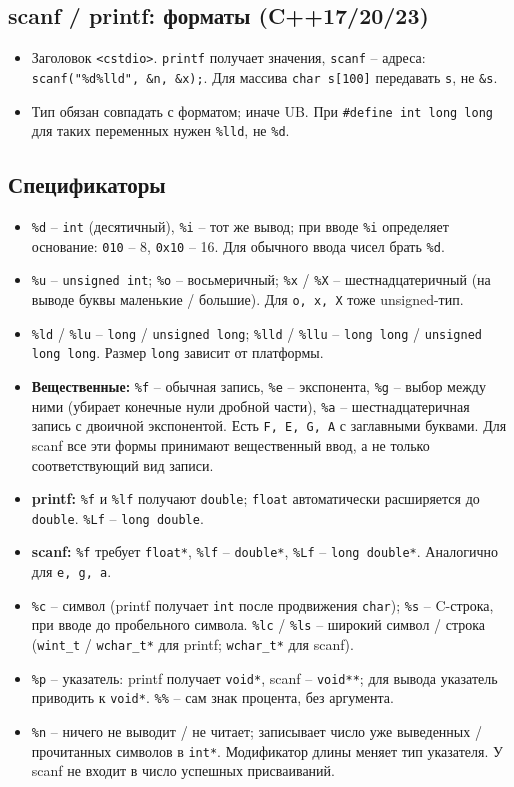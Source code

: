 \subsection{scanf / printf: форматы (C++17/20/23)}
\begin{itemize}[leftmargin=*, nosep]
\item Заголовок \verb|<cstdio>|. \verb|printf| получает значения, \verb|scanf| -- адреса: \verb|scanf("%d%lld", &n, &x);|. Для массива \verb|char s[100]| передавать \verb|s|, не \verb|&s|.
\item Тип обязан совпадать с форматом; иначе UB. При \verb|#define int long long| для таких переменных нужен \verb|%lld|, не \verb|%d|.
\end{itemize}

\subsection{Спецификаторы}
\begin{itemize}[leftmargin=*, nosep]
\item \verb|%d| -- \verb|int| (десятичный), \verb|%i| -- тот же вывод; при вводе \verb|%i| определяет основание: \verb|010| -- 8, \verb|0x10| -- 16. Для обычного ввода чисел брать \verb|%d|.
\item \verb|%u| -- \verb|unsigned int|; \verb|%o| -- восьмеричный; \verb|%x| / \verb|%X| -- шестнадцатеричный (на выводе буквы маленькие / большие). Для \verb|o, x, X| тоже unsigned-тип.
\item \verb|%ld| / \verb|%lu| -- \verb|long| / \verb|unsigned long|; \verb|%lld| / \verb|%llu| -- \verb|long long| / \verb|unsigned long long|. Размер \verb|long| зависит от платформы.
\item \textbf{Вещественные:} \verb|%f| -- обычная запись, \verb|%e| -- экспонента, \verb|%g| -- выбор между ними (убирает конечные нули дробной части), \verb|%a| -- шестнадцатеричная запись с двоичной экспонентой. Есть \verb|F, E, G, A| с заглавными буквами. Для scanf все эти формы принимают вещественный ввод, а не только соответствующий вид записи.
\item \textbf{printf:} \verb|%f| и \verb|%lf| получают \verb|double|; \verb|float| автоматически расширяется до \verb|double|. \verb|%Lf| -- \verb|long double|.
\item \textbf{scanf:} \verb|%f| требует \verb|float*|, \verb|%lf| -- \verb|double*|, \verb|%Lf| -- \verb|long double*|. Аналогично для \verb|e, g, a|.
\item \verb|%c| -- символ (printf получает \verb|int| после продвижения \verb|char|); \verb|%s| -- C-строка, при вводе до пробельного символа. \verb|%lc| / \verb|%ls| -- широкий символ / строка (\verb|wint_t| / \verb|wchar_t*| для printf; \verb|wchar_t*| для scanf).
\item \verb|%p| -- указатель: printf получает \verb|void*|, scanf -- \verb|void**|; для вывода указатель приводить к \verb|void*|. \verb|%%| -- сам знак процента, без аргумента.
\item \verb|%n| -- ничего не выводит / не читает; записывает число уже выведенных / прочитанных символов в \verb|int*|. Модификатор длины меняет тип указателя. У scanf не входит в число успешных присваиваний.
\end{itemize}

